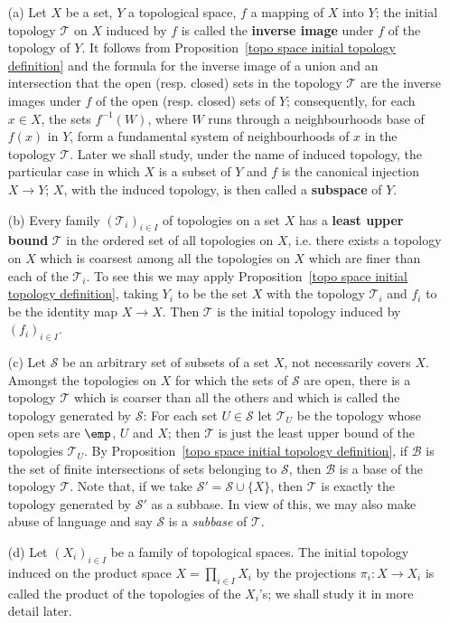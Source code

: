 \begin{example}
\mbox{}
\begin{enumerate}
\item[(a)] Let $X$ be a set, $Y$ a topological space, $f$ a mapping of $X$ into $Y$; the initial topology $\mathcal{T}$ on $X$ induced by $f$ is called the \textbf{inverse image} under $f$ of the topology of $Y$. It follows from Proposition~\ref{topo space initial topology definition} and the formula for the inverse image of a union and an intersection that the open (resp. closed) sets in the topology $\mathcal{T}$ are the inverse images under $f$ of the open (resp. closed) sets of $Y$; consequently, for each $x\in X$, the sets $f^{-1}(W)$, where $W$ runs through a neighbourhoods base of $f(x)$ in $Y$, form a fundamental system of neighbourhoods of $x$ in the topology $\mathcal{T}$. Later we shall study, under the name of induced topology, the particular case in which $X$ is a subset of $Y$ and $f$ is the canonical injection $X\to Y$; $X$, with the induced topology, is then called a \textbf{subspace} of $Y$.
\item[(b)] Every family $(\mathcal{T}_i)_{i\in I}$ of topologies on a set $X$ has a \textbf{least upper bound} $\mathcal{T}$ in the ordered set of all topologies on $X$, i.e. there exists a topology on $X$ which is coarsest among all the topologies on $X$ which are finer than each of the $\mathcal{T}_i$. To see this we may apply Proposition~\ref{topo space initial topology definition}, taking $Y_i$ to be the set $X$ with the topology $\mathcal{T}_i$ and $f_i$ to be the identity map $X\to X$. Then $\mathcal{T}$ is the initial topology induced by $(f_i)_{i\in I}$.
\item[(c)] Let $\mathcal{S}$ be an arbitrary set of subsets of a set $X$, not necessarily covers $X$. Amongst the topologies on $X$ for which the sets of $\mathcal{S}$ are open, there is a topology $\mathcal{T}$ which is coarser than all the others and which is called the topology generated by $\mathcal{S}$: For each set $U\in\mathcal{S}$ let $\mathcal{T}_U$ be the topology whose open sets are $\emp$, $U$ and $X$; then $\mathcal{T}$ is just the least upper bound of the topologies $\mathcal{T}_U$. By Proposition~\ref{topo space initial topology definition}, if $\mathcal{B}$ is the set of finite intersections of sets belonging to $\mathcal{S}$, then $\mathcal{B}$ is a base of the topology $\mathcal{T}$. Note that, if we take $\mathcal{S}'=\mathcal{S}\cup\{X\}$, then $\mathcal{T}$ is exactly the topology generated by $\mathcal{S}'$ as a subbase. In view of this, we may also make abuse of language and say $\mathcal{S}$ is a \textit{subbase} of $\mathcal{T}$.
\item[(d)] Let $(X_i)_{i\in I}$ be a family of topological spaces. The initial topology induced on the product space $X=\prod_{i\in I}X_i$ by the projections $\pi_i:X\to X_i$ is called the product of the topologies of the $X_i$'s; we shall study it in more detail later.
\end{enumerate}
\end{example}
